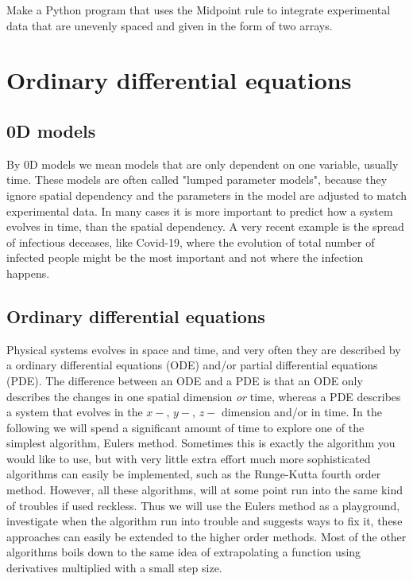 \documentclass[graybox,sectrefs,envcountresetchap,open=right,final]{svmonodo}
\newenvironment{doconceexercise}{}{}
\begin{document}
\begin{doconceexercise}
\noindent


Make a Python program that uses the Midpoint rule to integrate experimental data that are unevenly spaced and given in the form of two arrays.


\end{doconceexercise}


\chapter{Ordinary differential equations}
\label{ch:ode}

\section{0D models}
By 0D models we mean models that are only dependent on one variable, usually time. These models are often called "lumped parameter models", because they ignore spatial dependency and the parameters in the model are adjusted to match experimental data. In many cases it is more important to predict how a system evolves in time, than the spatial dependency. A very recent example is the spread of infectious deceases, like Covid-19, where the evolution of total number of infected people might be the most important and not where the infection happens. 

\section{Ordinary differential equations}

Physical systems evolves in space and time, and very often they are described by a ordinary differential equations (ODE) and/or
partial differential equations (PDE). The difference between an ODE and a PDE is that an ODE only describes 
the changes in one spatial dimension \emph{or} time, whereas a PDE describes a system that evolves in the $x-$, $y-$, $z-$ dimension 
and/or in time. In the following we will spend a significant
amount of time to explore one of the simplest algorithm, Eulers method.
Sometimes this is exactly the algorithm you would like to use, but with very 
little extra effort much more sophisticated algorithms can easily be implemented, such as the Runge-Kutta fourth order method.
However, all these algorithms, will at some point run into the same
kind of troubles if used reckless. Thus we will use the Eulers method as a playground,
investigate when the algorithm run into trouble and
suggests ways to fix it, these approaches can easily be extended to the higher order methods. Most of the other algorithms boils down to the same idea of extrapolating
a function using derivatives multiplied with a small step size.  
\end{document}

